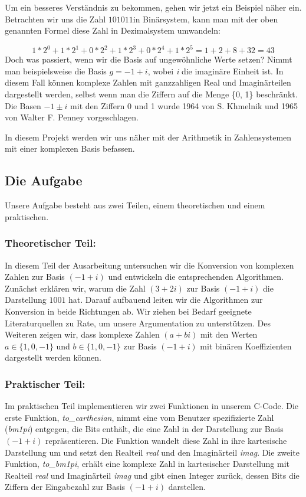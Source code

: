 \documentclass[course=erap]{aspdoc}
\begin{document}
    Um ein besseres Verständnis zu bekommen, gehen wir jetzt ein Beispiel näher ein.
    Betrachten wir uns die Zahl $101011$\space in Binärsystem, kann man mit der oben genannten Formel diese Zahl in Dezimalsystem umwandeln:

    \[1* 2^0 + 1*2^1 + 0* 2^2 + 1* 2^3 + 0* 2^4 + 1* 2^5 = 1+2+8+32 = 43 \]
    \newpage
    Doch was passiert, wenn wir die Basis auf ungewöhnliche Werte setzen?
    Nimmt man beispielsweise die Basis $g = -1 + i$, wobei \textit{i} die imaginäre Einheit ist.
    In diesem Fall können komplexe Zahlen mit ganzzahligen Real und Imaginärteilen dargestellt werden, selbst wenn man die Ziffern auf die Menge \{0, 1\} beschränkt.
    Die Basen $ -1 \pm i $ mit den Ziffern 0 und 1 wurde 1964 von S. Khmelnik und 1965 von Walter F. Penney vorgeschlagen.

    In diesem Projekt werden wir uns näher mit der Arithmetik in Zahlensystemen mit einer komplexen Basis befassen.

    \subsection{Die Aufgabe}

    Unsere Aufgabe besteht aus zwei Teilen, einem theoretischen und einem praktischen.

    \subsubsection{Theoretischer Teil:}
    In diesem Teil der Ausarbeitung untersuchen wir die Konversion von komplexen Zahlen zur Basis $(-1 + i)$ und entwickeln die entsprechenden Algorithmen.
    Zunächst erklären wir, warum die Zahl $(3 + 2i)$ zur Basis $(-1 + i)$ die Darstellung $1001$ hat.
    \newline
    Darauf aufbauend leiten wir die Algorithmen zur Konversion in beide Richtungen ab.
    Wir ziehen bei Bedarf geeignete Literaturquellen zu Rate, um unsere Argumentation zu unterstützen.
    Des Weiteren zeigen wir, dass komplexe Zahlen $(a + bi)$ mit den Werten $a \in \{1, 0, -1\}$ und $b \in \{1, 0, -1\}$ zur Basis $(-1 + i)$ mit binären Koeffizienten dargestellt werden können.

    \subsubsection{Praktischer Teil:}
    Im praktischen Teil implementieren wir zwei Funktionen in unserem C-Code.
    Die erste Funktion, \textit{to\_carthesian}, nimmt eine vom Benutzer spezifizierte Zahl (\textit{bm1pi}) entgegen, die Bits enthält, die eine Zahl in der Darstellung zur Basis $(-1 + i)$ repräsentieren.
    Die Funktion wandelt diese Zahl in ihre kartesische Darstellung um und setzt den Realteil \textit{real} und den Imaginärteil \textit{imag}.
    \newline
    Die zweite Funktion, \textit{to\_bm1pi}, erhält eine komplexe Zahl in kartesischer Darstellung mit Realteil \textit{real} und Imaginärteil \textit{imag} und gibt einen Integer zurück, dessen Bits die Ziffern der Eingabezahl zur Basis $(-1 + i)$ darstellen.
\end{document}
